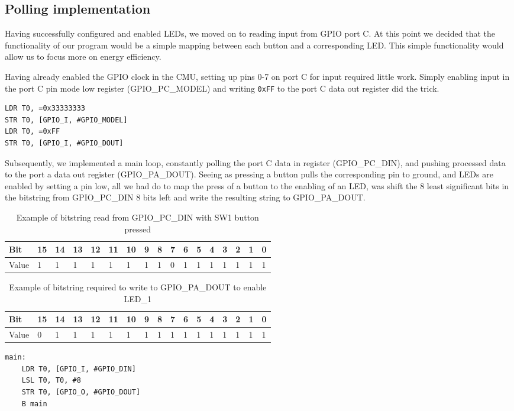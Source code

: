 \subsection{Polling implementation}
\label{sec:polling-implementation}

Having successfully configured and enabled LEDs, we moved on to reading input from GPIO port C. At this point we decided that the functionality of our program would be a simple mapping between each button and a corresponding LED. This simple functionality would allow us to focus more on energy efficiency.

Having already enabled the GPIO clock in the CMU, setting up pins 0-7 on port C for input required little work. Simply enabling input in the port C pin mode low register (GPIO\_PC\_MODEL) and writing \texttt{0xFF} to the port C data out register did the trick.

\begin{lstlisting}[label=enable-gpio-input, caption=Enabling input on port C]
LDR T0, =0x33333333
STR T0, [GPIO_I, #GPIO_MODEL]
LDR T0, =0xFF
STR T0, [GPIO_I, #GPIO_DOUT]
\end{lstlisting}

Subsequently, we implemented a main loop, constantly polling the port C data in register (GPIO\_PC\_DIN), and pushing processed data to the port a data out register (GPIO\_PA\_DOUT). Seeing as pressing a button pulls the corresponding pin to ground, and LEDs are enabled by setting a pin low, all we had do to map the press of a button to the enabling of an LED, was shift the 8 least significant bits in the bitstring from GPIO\_PC\_DIN 8 bits left and write the resulting string to GPIO\_PA\_DOUT. 

\begin{table}[!h]
    \begin{tabular}{l|l|l|l|l|l|l|l|l|l|l|l|l|l|l|l|l}
    Bit   & 15 & 14 & 13 & 12 & 11 & 10 & 9 & 8 & 7 & 6 & 5 & 4 & 3 & 2 & 1 & 0 \\ \hline
    Value & 1  & 1  & 1  & 1  & 1  & 1  & 1 & 1 & 0 & 1 & 1 & 1 & 1 & 1 & 1 & 1 \\
    \end{tabular}
    \caption{Example of bitstring read from GPIO\_PC\_DIN with SW1 button pressed}
\end{table}

\begin{table}[!h]
    \begin{tabular}{l|l|l|l|l|l|l|l|l|l|l|l|l|l|l|l|l}
    Bit   & 15 & 14 & 13 & 12 & 11 & 10 & 9 & 8 & 7 & 6 & 5 & 4 & 3 & 2 & 1 & 0 \\ \hline
    Value & 0  & 1  & 1  & 1  & 1  & 1  & 1 & 1 & 1 & 1 & 1 & 1 & 1 & 1 & 1 & 1 \\
    \end{tabular}
    \caption{Example of bitstring required to write to GPIO\_PA\_DOUT to enable LED\_1}
\end{table}


\newpage

\begin{lstlisting}[label=main-polling-loop, caption=Main loop]
main:
    LDR T0, [GPIO_I, #GPIO_DIN]
    LSL T0, T0, #8
    STR T0, [GPIO_O, #GPIO_DOUT]
    B main
\end{lstlisting}
